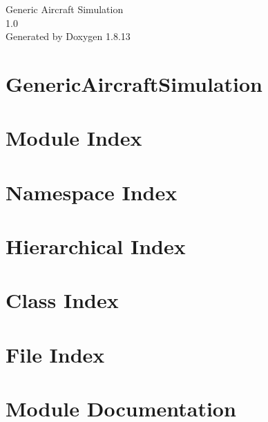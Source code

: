 \documentclass[twoside]{book}
\newcommand{\+}{\discretionary{\mbox{\scriptsize$\hookleftarrow$}}{}{}}
\newcommand{\clearemptydoublepage}{%
  \newpage{\pagestyle{empty}\cleardoublepage}%
}
\begin{document}
\hypersetup{pageanchor=false,
             bookmarksnumbered=true,
             pdfencoding=unicode
            }
\begin{titlepage}
\vspace*{7cm}
\begin{center}%
{\Large Generic Aircraft Simulation \\[1ex]\large 1.\+0 }\\
\vspace*{1cm}
{\large Generated by Doxygen 1.8.13}\\
\end{center}
\end{titlepage}
\clearemptydoublepage
{}
\tableofcontents
\clearemptydoublepage
{}
\hypersetup{pageanchor=true}

\chapter{Generic\+Aircraft\+Simulation}
\label{md__c_1__users_janol__desktop__simulation__stand230618__r_e_a_d_m_e}

\chapter{Module Index}

\chapter{Namespace Index}

\chapter{Hierarchical Index}

\chapter{Class Index}

\chapter{File Index}

\chapter{Module Documentation}
















\end{document}

